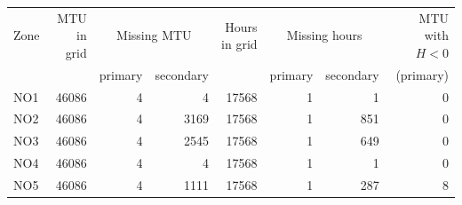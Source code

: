 \begin{tabular}{lrrrrrrr}
\toprule
Zone & MTU in grid & \multicolumn{2}{c}{Missing MTU} & Hours in grid & \multicolumn{2}{c}{Missing hours} & MTU with $H<0$ \\
\cmidrule(lr){3-4}\cmidrule(lr){6-7}
 & & primary & secondary & & primary & secondary & (primary) \\
\midrule
NO1 & 46086 & 4 & 4 & 17568 & 1 & 1 & 0 \\
NO2 & 46086 & 4 & 3169 & 17568 & 1 & 851 & 0 \\
NO3 & 46086 & 4 & 2545 & 17568 & 1 & 649 & 0 \\
NO4 & 46086 & 4 & 4 & 17568 & 1 & 1 & 0 \\
NO5 & 46086 & 4 & 1111 & 17568 & 1 & 287 & 8 \\
\bottomrule
\end{tabular}
